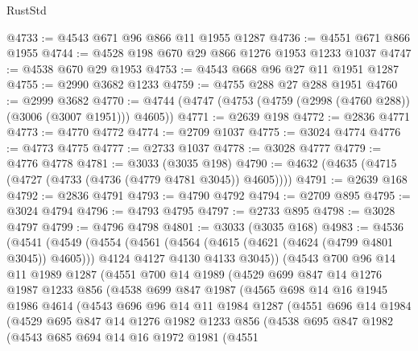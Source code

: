 \begin{lexlean}{RustStd}
\begin{coremodule}
@4733 := @4543 @671 @96 @866 @11 @1955 @1287
@4736 := @4551 @671 @866 @1955
@4744 := @4528 @198 @670 @29 @866 @1276 @1953 @1233 @1037
@4747 := @4538 @670 @29 @1953
@4753 := @4543 @668 @96 @27 @11 @1951 @1287
@4755 := @2990 @3682 @1233
@4759 := @4755 @288 @27 @288 @1951
@4760 := @2999 @3682
@4770 := @4744 (@4747 (@4753 (@4759 (@2998 (@4760 @288)) (@3006 (@3007 @1951))) @4605))
@4771 := @2639 @198
@4772 := @2836 @4771
@4773 := @4770 @4772
@4774 := @2709 @1037
@4775 := @3024 @4774
@4776 := @4773 @4775
@4777 := @2733 @1037
@4778 := @3028 @4777
@4779 := @4776 @4778
@4781 := @3033 (@3035 @198)
@4790 := @4632 (@4635 (@4715 (@4727 (@4733 (@4736 (@4779 @4781 @3045)) @4605))))
@4791 := @2639 @168
@4792 := @2836 @4791
@4793 := @4790 @4792
@4794 := @2709 @895
@4795 := @3024 @4794
@4796 := @4793 @4795
@4797 := @2733 @895
@4798 := @3028 @4797
@4799 := @4796 @4798
@4801 := @3033 (@3035 @168)
@4983 := @4536
    (@4541
      (@4549
        (@4554
          (@4561
            (@4564 (@4615 (@4621 (@4624 (@4799 @4801 @3045)) @4605)))
            @4124
            @4127
            @4130
            @4133
            @3045))
        (@4543
          @700
          @96
          @14
          @11
          @1989
          @1287
          (@4551
            @700
            @14
            @1989
            (@4529
              @699
              @847
              @14
              @1276
              @1987
              @1233
              @856
              (@4538
                @699
                @847
                @1987
                (@4565
                  @698
                  @14
                  @16
                  @1945
                  @1986
                  @4614
                  (@4543
                    @696
                    @96
                    @14
                    @11
                    @1984
                    @1287
                    (@4551
                      @696
                      @14
                      @1984
                      (@4529
                        @695
                        @847
                        @14
                        @1276
                        @1982
                        @1233
                        @856
                        (@4538
                          @695
                          @847
                          @1982
                          (@4543
                            @685
                            @694
                            @14
                            @16
                            @1972
                            @1981
                            (@4551

\end{coremodule}
\end{lexlean}
